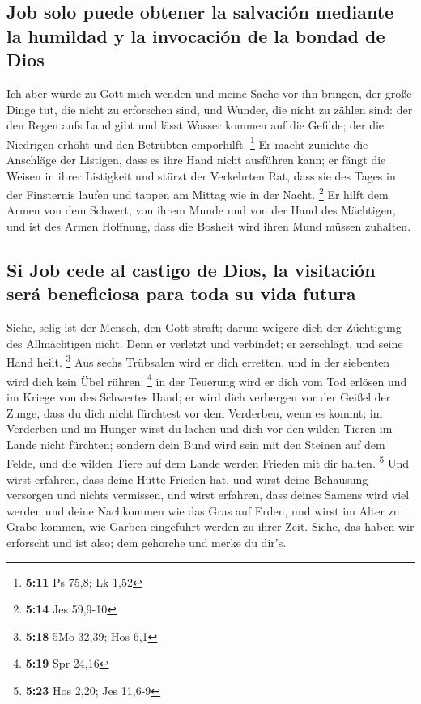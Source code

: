 \hypertarget{job-solo-puede-obtener-la-salvaciuxf3n-mediante-la-humildad-y-la-invocaciuxf3n-de-la-bondad-de-dios}{%
\subsection{Job solo puede obtener la salvación mediante la humildad y
la invocación de la bondad de
Dios}\label{job-solo-puede-obtener-la-salvaciuxf3n-mediante-la-humildad-y-la-invocaciuxf3n-de-la-bondad-de-dios}}

 Ich aber würde zu Gott mich wenden und meine Sache vor
ihn bringen,  der große Dinge tut, die nicht zu erforschen
sind, und Wunder, die nicht zu zählen sind:  der den
Regen aufs Land gibt und lässt Wasser kommen auf die Gefilde;
 der die Niedrigen erhöht und den Betrübten emporhilft.
\footnote{\textbf{5:11} Ps 75,8; Lk 1,52}  Er macht
zunichte die Anschläge der Listigen, dass es ihre Hand nicht ausführen
kann;  er fängt die Weisen in ihrer Listigkeit und stürzt
der Verkehrten Rat,  dass sie des Tages in der Finsternis
laufen und tappen am Mittag wie in der Nacht. \footnote{\textbf{5:14}
  Jes 59,9-10}  Er hilft dem Armen von dem Schwert, von
ihrem Munde und von der Hand des Mächtigen,  und ist des
Armen Hoffnung, dass die Bosheit wird ihren Mund müssen zuhalten.

\hypertarget{si-job-cede-al-castigo-de-dios-la-visitaciuxf3n-seruxe1-beneficiosa-para-toda-su-vida-futura}{%
\subsection{Si Job cede al castigo de Dios, la visitación será
beneficiosa para toda su vida
futura}\label{si-job-cede-al-castigo-de-dios-la-visitaciuxf3n-seruxe1-beneficiosa-para-toda-su-vida-futura}}

 Siehe, selig ist der Mensch, den Gott straft; darum
weigere dich der Züchtigung des Allmächtigen nicht.  Denn
er verletzt und verbindet; er zerschlägt, und seine Hand heilt.
\footnote{\textbf{5:18} 5Mo 32,39; Hos 6,1}  Aus sechs
Trübsalen wird er dich erretten, und in der siebenten wird dich kein
Übel rühren: \footnote{\textbf{5:19} Spr 24,16}  in der
Teuerung wird er dich vom Tod erlösen und im Kriege von des Schwertes
Hand;  er wird dich verbergen vor der Geißel der Zunge,
dass du dich nicht fürchtest vor dem Verderben, wenn es kommt;
 im Verderben und im Hunger wirst du lachen und dich vor
den wilden Tieren im Lande nicht fürchten;  sondern dein
Bund wird sein mit den Steinen auf dem Felde, und die wilden Tiere auf
dem Lande werden Frieden mit dir halten. \footnote{\textbf{5:23} Hos
  2,20; Jes 11,6-9}  Und wirst erfahren, dass deine Hütte
Frieden hat, und wirst deine Behausung versorgen und nichts vermissen,
 und wirst erfahren, dass deines Samens wird viel werden
und deine Nachkommen wie das Gras auf Erden,  und wirst
im Alter zu Grabe kommen, wie Garben eingeführt werden zu ihrer Zeit.
 Siehe, das haben wir erforscht und ist also; dem
gehorche und merke du dir's.

